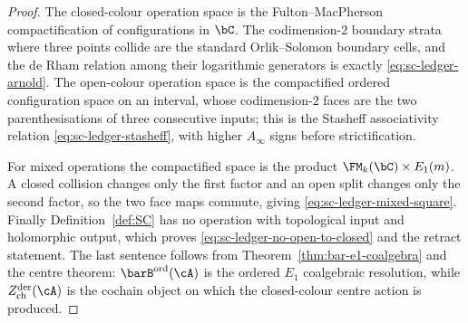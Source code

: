 \begin{proof}
The closed-colour operation space is the Fulton--MacPherson
compactification of configurations in $\bC$.  The codimension-$2$
boundary strata where three points collide are the standard
Orlik--Solomon boundary cells, and the de Rham relation among their
logarithmic generators is exactly
\eqref{eq:sc-ledger-arnold}.  The open-colour operation space is the
compactified ordered configuration space on an interval, whose
codimension-$2$ faces are the two parenthesisations of three
consecutive inputs; this is the Stasheff associativity relation
\eqref{eq:sc-ledger-stasheff}, with higher $A_\infty$ signs before
strictification.

For mixed operations the compactified space is the product
$\FM_k(\bC)\times E_1(m)$.  A closed collision changes only the first
factor and an open split changes only the second factor, so the two
face maps commute, giving \eqref{eq:sc-ledger-mixed-square}.  Finally
Definition~\ref{def:SC} has no operation with topological input and
holomorphic output, which proves \eqref{eq:sc-ledger-no-open-to-closed}
and the retract statement.  The last sentence follows from
Theorem~\ref{thm:bar-e1-coalgebra} and the centre theorem:
$\barB^{\mathrm{ord}}(\cA)$ is the ordered $E_1$ coalgebraic
resolution, while $Z^{\mathrm{der}}_{\mathrm{ch}}(\cA)$ is the
cochain object on which the closed-colour centre action is produced.
\end{proof}

